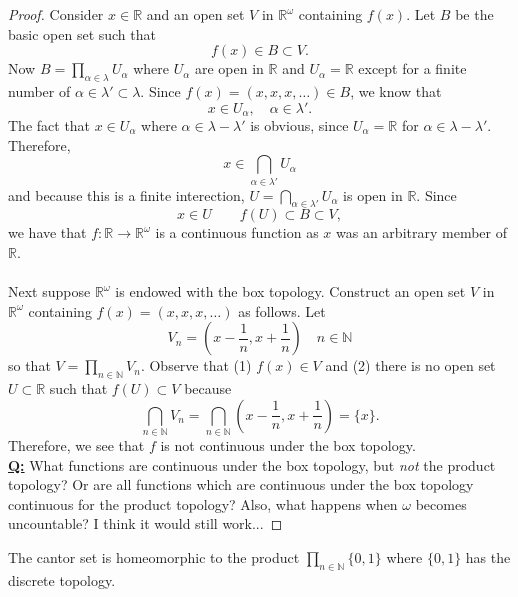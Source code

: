 \documentclass[letter,12pt,twoside]{hmcpset}
\begin{document}
\begin{proof}
    Consider $x \in \mathbb{R}$ and an open set $V$ in
    $\mathbb{R}^\omega$ containing $f(x)$. Let $B$ be the basic open
    set such that 
    \[
        f(x) \in B \subset V.       
    \]
    Now $B = \prod_{\alpha \in \lambda} U_{\alpha}$ where $U_{\alpha}$
    are open in $\mathbb{R}$ and $U_{\alpha} = \mathbb{R}$
    except for a finite number of
    $\alpha \in \lambda' \subset \lambda$. Since $f(x) = (x, x, x, 
    \dots ) \in B$, we know that 
    \[
       x \in U_{\alpha}, \quad \alpha \in \lambda'.
    \]
    The fact that $x \in U_{\alpha}$ where $\alpha \in \lambda -
    \lambda'$ is obvious, since $U_{\alpha} = \mathbb{R}$ for $\alpha
    \in 
    \lambda - \lambda'$. Therefore, 
    \[
       x \in \bigcap\limits_{\alpha \in \lambda'} U_{\alpha} 
    \]
    and because this is a finite interection, $U =
    \bigcap\limits_{\alpha \in \lambda'} U_{\alpha}$ is open in
    $\mathbb{R}$.
    Since
    \[
       x \in U \qquad f(U) \subset B \subset V,
    \]
    we have that $f: \mathbb{R} \to \mathbb{R}^\omega$ is a continuous function as $x$ was an arbitrary 
    member of $\mathbb{R}$. 
    \\
    \\
    Next suppose $\mathbb{R}^\omega$ is endowed with the box topology.
    Construct an open set $V$ in $\mathbb{R}^{\omega}$ containing $f(x) = (x, x, x, \dots)$ as
    follows. Let 
    \[
      V_n = \left(x - \frac{1}{n}, x + \frac{1}{n}\right) \quad n \in \mathbb{N} 
    \]
    so that $V = \prod\limits_{n \in \mathbb{N}} V_n$. 
    Observe that (1) $f(x) \in V$ and (2) there is no open set $U
    \subset \mathbb{R}$ such that $f(U) \subset V$ because 
    \[
       \bigcap\limits_{n \in \mathbb{N}} V_n =  \bigcap\limits_{n \in \mathbb{N}} \left(x - \frac{1}{n}, x + \frac{1}{n}\right) = \{x\}.
    \]
    Therefore, we see that $f$ is not continuous under the box
    topology.\\
    \noindent
    \underline{\textbf{Q:}} What functions are continuous under the box topology,
    but \emph{not} the product topology? Or are all functions which
    are continuous under the box topology continuous for the product
    topology? Also, what happens when $\omega$ becomes uncountable? I
    think it would still work...
\end{proof}

\begin{problem}[Theorem 8.42]
    The cantor set is homeomorphic to the product $\prod_{n \in
    \mathbb{N}} \{0, 1\}$ where $\{0, 1\}$ has the discrete topology. 
\end{problem}
\end{document}
